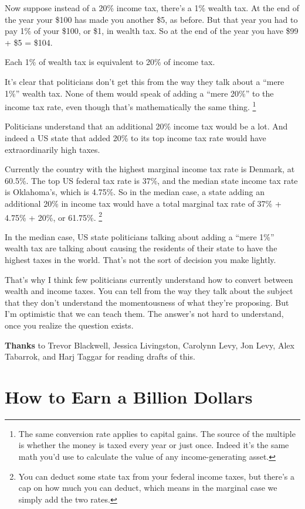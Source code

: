 \documentclass[12pt]{book}
\begin{document}
Now suppose instead of a 20\% income tax, there's a 1\% wealth tax. At
the end of the year your \$100 has made you another \$5, as before. But
that year you had to pay 1\% of your \$100, or \$1, in wealth tax. So at
the end of the year you have \$99 + \$5 = \$104.

Each 1\% of wealth tax is equivalent to 20\% of income tax.

It's clear that politicians don't get this from the way they talk about
a ``mere 1\%'' wealth tax. None of them would speak of adding a ``mere
20\%'' to the income tax rate, even though that's mathematically the
same thing. \footnote{The same conversion rate applies to capital gains. The source of
the multiple is whether the money is taxed every year or just once.
Indeed it's the same math you'd use to calculate the value of any
income-generating asset.}

Politicians understand that an additional 20\% income tax would be a
lot. And indeed a US state that added 20\% to its top income tax rate
would have extraordinarily high taxes.

Currently the country with the highest marginal income tax rate is
Denmark, at 60.5\%. The top US federal tax rate is 37\%, and the median
state income tax rate is Oklahoma's, which is 4.75\%. So in the median
case, a state adding an additional 20\% in income tax would have a total
marginal tax rate of 37\% + 4.75\% + 20\%, or 61.75\%.
\footnote{You can deduct some state tax from your federal income taxes,
but there's a cap on how much you can deduct, which means in the
marginal case we simply add the two rates.}

In the median case, US state politicians talking about adding a ``mere
1\%'' wealth tax are talking about causing the residents of their state
to have the highest taxes in the world. That's not the sort of decision
you make lightly.

That's why I think few politicians currently understand how to convert
between wealth and income taxes. You can tell from the way they talk
about the subject that they don't understand the momentousness of what
they're proposing. But I'm optimistic that we can teach them. The
answer's not hard to understand, once you realize the question exists.


\textbf{Thanks} to Trevor Blackwell, Jessica Livingston, Carolynn Levy,
Jon Levy, Alex Tabarrok, and Harj Taggar for reading drafts of this.
\chapter{How to Earn a Billion Dollars}
\end{document}
